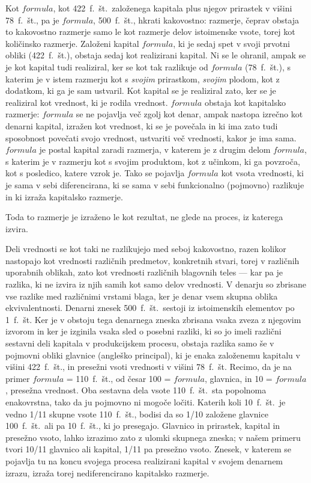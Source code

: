 \documentclass[a5paper]{scrbook}
\begin{document}
Kot \( formula \), kot 422~f.~št.\ založenega kapitala plus njegov prirastek v višini 78~f.~št., pa je \( formula \), 500~f.~št., hkrati kakovostno: razmerje, čeprav obstaja to kakovostno razmerje samo le kot razmerje delov istoimenske vsote, torej kot količinsko razmerje. Založeni kapital \( formula \), ki je sedaj spet v svoji prvotni obliki (422~f.~št.), obstaja sedaj kot realizirani kapital. Ni se le ohranil, ampak se je kot kapital tudi realiziral, ker se kot tak razlikuje od \( formula \) (78~f.~št.), s katerim je v istem razmerju kot s \emph{svojim} prirastkom, \emph{svojim} plodom, kot z dodatkom, ki ga je sam ustvaril. Kot kapital se je realiziral zato, ker se je realiziral kot vrednost, ki je rodila vrednost. \( formula \) obstaja kot kapitalsko razmerje: \( formula \) se ne pojavlja več zgolj kot denar, ampak nastopa izrečno kot denarni kapital, izražen kot vrednost, ki se je povečala in ki ima zato tudi sposobnost povečati svojo vrednost, ustvariti več vrednosti, kakor je ima sama. \( formula \) je postal kapital zaradi razmerja, v katerem je z drugim delom \( formula \), s katerim je v razmerju kot s svojim produktom, kot z učinkom, ki ga povzroča, kot s posledico, katere vzrok je. Tako se pojavlja \( formula \) kot vsota vrednosti, ki je sama v sebi diferencirana, ki se sama v sebi funkcionalno (pojmovno) razlikuje in ki izraža kapitalsko razmerje.

Toda to razmerje je izraženo le kot rezultat, ne glede na proces, iz katerega izvira.

Deli vrednosti se kot taki ne razlikujejo med seboj kakovostno, razen kolikor nastopajo kot vrednosti različnih predmetov, konkretnih stvari, torej v različnih uporabnih oblikah, zato kot vrednosti različnih blagovnih teles --- kar pa je razlika, ki ne izvira iz njih samih kot samo delov vrednosti. V denarju so zbrisane vse razlike med različnimi vrstami blaga, ker je denar vsem skupna oblika ekvivalentnosti. Denarni znesek 500~f.~št.\ sestoji iz istoimenskih elementov po 1~f.~št. Ker je v obstoju tega denarnega zneska zbrisana vsaka zveza z njegovim izvorom in ker je izginila vsaka sled o posebni razliki, ki so jo imeli različni sestavni deli kapitala v produkcijskem procesu, obstaja razlika samo še v pojmovni obliki glavnice (angleško principal), ki je enaka založenemu kapitalu v višini 422~f.~št., in presežni vsoti vrednosti v višini 78~f.~št. Recimo, da je na primer \( formula \) = 110~f.~št., od česar 100 = \( formula \), glavnica, in 10 = \( formula \), presežna vrednost. Oba sestavna dela vsote 110~f.~št.\ sta popolnoma enakovrstna, tako da ju pojmovno ni mogoče ločiti. Katerih koli 10~f.~št.\ je vedno 1/11 skupne vsote 110~f.~št., bodisi da so 1/10 založene glavnice 100~f.~št.\ ali pa 10~f.~št., ki jo presegajo. Glavnico in prirastek, kapital in presežno vsoto, lahko izrazimo zato z ulomki skupnega zneska; v našem primeru tvori 10/11 glavnico ali kapital, 1/11 pa presežno vsoto. Znesek, v katerem se pojavlja tu na koncu svojega procesa realizirani kapital v svojem denarnem izrazu, izraža torej nediferencirano kapitalsko razmerje.
\end{document}
